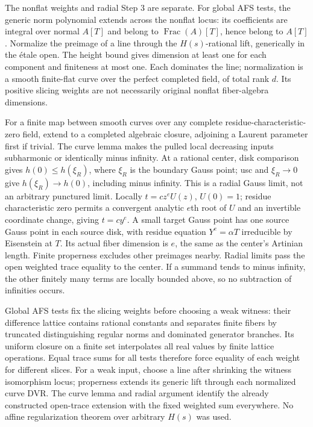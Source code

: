\documentclass[
  10pt,
]{article}
\begin{document}
The nonflat weights and radial Step 3 are separate. For global AFS
tests, the generic norm polynomial extends across the nonflat locus: its
coefficients are integral over normal \(A[T]\) and belong to
\(\operatorname{Frac}(A)[T]\), hence belong to \(A[T]\). Normalize the
preimage of a line through the \(H(s)\)-rational lift, generically in
the étale open. The height bound gives dimension at least one for each
component and finiteness at most one. Each dominates the line;
normalization is a smooth finite-flat curve over the perfect completed
field, of total rank \(d\). Its positive slicing weights are not
necessarily original nonflat fiber-algebra dimensions.

For a finite map between smooth curves over any complete
residue-characteristic-zero field, extend to a completed algebraic
closure, adjoining a Laurent parameter first if trivial. The curve lemma
makes the pulled local decreasing inputs subharmonic or identically
minus infinity. At a rational center, disk comparison gives
\(h(0)\le h(\xi_R)\), where \(\xi_R\) is the boundary Gauss point; usc
and \(\xi_R\to0\) give \(h(\xi_R)\to h(0)\), including minus infinity.
This is a radial Gauss limit, not an arbitrary punctured limit. Locally
\(t=cz^eU(z)\), \(U(0)=1\); residue characteristic zero permits a
convergent analytic \(e\)th root of \(U\) and an invertible coordinate
change, giving \(t=cy^e\). A small target Gauss point has one source
Gauss point in each source disk, with residue equation \(Y^e=\alpha T\)
irreducible by Eisenstein at \(T\). Its actual fiber dimension is \(e\),
the same as the center's Artinian length. Finite properness excludes
other preimages nearby. Radial limits pass the open weighted trace
equality to the center. If a summand tends to minus infinity, the other
finitely many terms are locally bounded above, so no subtraction of
infinities occurs.

Global AFS tests fix the slicing weights before choosing a weak witness:
their difference lattice contains rational constants and separates
finite fibers by truncated distinguishing regular norms and dominated
generator branches. Its uniform closure on a finite set interpolates all
real values by finite lattice operations. Equal trace sums for all tests
therefore force equality of each weight for different slices. For a weak
input, choose a line after shrinking the witness isomorphism locus;
properness extends its generic lift through each normalized curve DVR.
The curve lemma and radial argument identify the already constructed
open-trace extension with the fixed weighted sum everywhere. No affine
regularization theorem over arbitrary \(H(s)\) was used.
\end{document}
